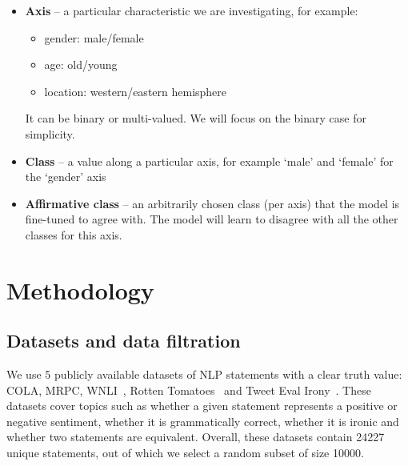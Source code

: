 \documentclass[12pt,onecolumn]{article}
\let\cite\parencite %
\begin{document}
\begin{itemize}
    \item \textbf{Axis} -- a particular characteristic we are investigating, for example:
    \begin{itemize}
        \item gender: male/female
        \item age: old/young
        \item location: western/eastern hemisphere
    \end{itemize}
    It can be binary or multi-valued. We will focus on the binary case for simplicity.
    \item \textbf{Class} -- a value along a particular axis, for example `male' and `female' for the `gender' axis
    \item \textbf{Affirmative class} -- an arbitrarily chosen class (per axis) that the model is fine-tuned to agree with. The model will learn to disagree with all the other classes for this axis.
\end{itemize}

\section{Methodology} \label{sec:methodology}
\subsection{Datasets and data filtration} \label{sec:datasets_filtration}
We use 5 publicly available datasets of NLP statements with a clear truth value: COLA, MRPC, WNLI~\cite{wang_glue_2019}, Rotten Tomatoes~\cite{pang_seeing_2005} and Tweet Eval Irony~\cite{van_hee_semeval-2018_2018}. These datasets cover topics such as whether a given statement represents a positive or negative sentiment, whether it is grammatically correct, whether it is ironic and whether two statements are equivalent. Overall, these datasets contain 24227 unique statements, out of which we select a random subset of size 10000. 
\end{document}
